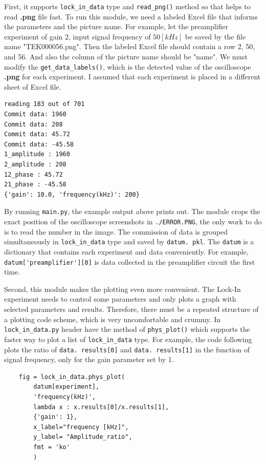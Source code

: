 \documentclass{article}
\begin{document}
 First, it supports \verb|lock_in_data| type and \verb|read_png()| method so that helps to read \textbf{.png} file fast.
 To run this module, we need a labeled Excel file that informs the parameters and the picture name.
 For example, let the preamplifier experiment of gain 2, input signal frequency of $50  [kHz]$ be saved by the file name "TEK000056.png".
 Then the labeled Excel file should contain a row 2, 50, and 56.
 And also the column of the picture name should be "name".
 We must modify the \verb|get_data_labels()|, which is the detected value of the oscilloscope \textbf{.png} for each experiment.
 I assumed that each experiment is placed in a different sheet of Excel file.
 
 \begin{verbatim}
reading 183 out of 701
Commit data: 1960
Commit data: 208
Commit data: 45.72
Commit data: -45.58
1_amplitude : 1960
2_amplitude : 208
12_phase : 45.72
21_phase : -45.58
{'gain': 10.0, 'frequency(kHz)': 200}
 \end{verbatim}
 

 By running \verb|main.py|, the example output above prints out.
 The module crops the exact position of the oscilloscope screenshots in \verb|./ERROR.PNG|, the only work to do is to read the number in the image.
 The commission of data is grouped simultaneously in \verb|lock_in_data| type and saved by \verb|datum. pkl|.
 The \verb|datum| is a dictionary that contains each experiment and data conveniently.
 For example, \verb|datum['preamplifier'][0]| is data collected in the preamplifier circuit the first time.

 Second, this module makes the plotting even more convenient.
 The Lock-In experiment needs to control some parameters and only plots a graph with selected parameters and results.
 Therefore, there must be a repeated structure of a plotting code scheme, which is very uncomfortable and crummy.
 In \verb|lock_in_data.py| header have the method of \verb|phys_plot()| which supports the faster way to plot a list of \verb|lock_in_data| type.
 For example, the code following plots the ratio of \verb|data. results[0]| and \verb|data. results[1]| in the function of signal frequency, only for the gain parameter set by 1.

 \begin{verbatim}
    fig = lock_in_data.phys_plot(
        datum[experiment],
        'frequency(kHz)',
        lambda x : x.results[0]/x.results[1], 
        {'gain': 1},
        x_label="frequency [kHz]",
        y_label= "Amplitude_ratio",
        fmt = 'ko'
        )    
 \end{verbatim}
\end{document}
